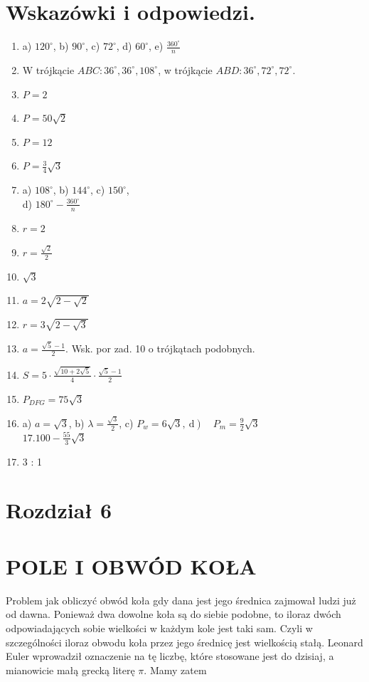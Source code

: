 \documentclass[10pt]{article}
\begin{document}
\section*{Wskazówki i odpowiedzi.}
\begin{enumerate}
  \item a) \(120^{\circ}\), b) \(90^{\circ}\), c) \(72^{\circ}\), d) \(60^{\circ}\), e) \(\frac{360^{\circ}}{n}\)
  \item W trójkącie \(A B C: 36^{\circ}, 36^{\circ}, 108^{\circ}\), w trójkącie \(A B D: 36^{\circ}, 72^{\circ}, 72^{\circ}\).
  \item \(P=2\)
  \item \(P=50 \sqrt{2}\)
  \item \(P=12\)
  \item \(P=\frac{3}{4} \sqrt{3}\)
  \item a) \(108^{\circ}\), b) \(144^{\circ}\), c) \(150^{\circ}\),\\
d) \(180^{\circ}-\frac{360^{\circ}}{n}\)
  \item \(r=2\)
  \item \(r=\frac{\sqrt{2}}{2}\)
  \item \(\sqrt{3}\)
  \item \(a=2 \sqrt{2-\sqrt{2}}\)
  \item \(r=3 \sqrt{2-\sqrt{3}}\)
  \item \(a=\frac{\sqrt{5}-1}{2}\). Wsk. por zad. 10 o trójkątach podobnych.
  \item \(S=5 \cdot \frac{\sqrt{10+2 \sqrt{5}}}{4} \cdot \frac{\sqrt{5}-1}{2}\)
  \item \(P_{D F G}=75 \sqrt{3}\)
  \item a) \(a=\sqrt{3}\), b) \(\lambda=\frac{\sqrt{3}}{2}\), c) \(\left.P_{w}=6 \sqrt{3}, \mathrm{~d}\right) \quad P_{m}=\frac{9}{2} \sqrt{3}\)\\
\(17.100-\frac{55}{3} \sqrt{3}\)
  \item 3 : 1
\end{enumerate}

\section*{Rozdział 6}
\section*{POLE I OBWÓD KOŁA}
Problem jak obliczyć obwód koła gdy dana jest jego średnica zajmował ludzi już od dawna. Ponieważ dwa dowolne koła są do siebie podobne, to iloraz dwóch odpowiadających sobie wielkości w każdym kole jest taki sam. Czyli w szczególności iloraz obwodu koła przez jego średnicę jest wielkością stałą. Leonard Euler wprowadził oznaczenie na tę liczbę, które stosowane jest do dzisiaj, a mianowicie małą grecką literę \(\pi\). Mamy zatem
\end{document}
